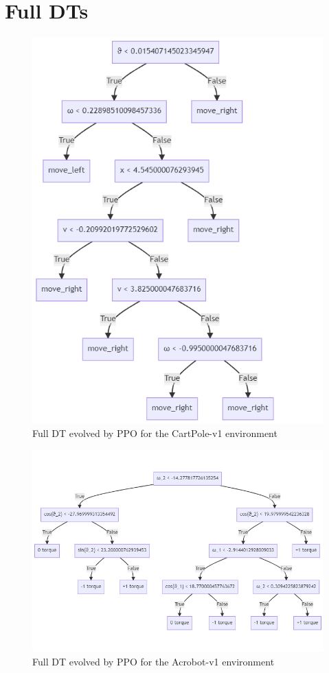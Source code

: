 \section{Full DTs}
\begin{figure}[h!]
    \centering
    \includegraphics[width=0.7\linewidth]{images/CartPole/bestPPOcompleteCP.png}
    \caption{Full DT evolved by PPO for the CartPole-v1 environment}
    \label{fig:TreeFullCP}
\end{figure}

\begin{figure}[h!]
    \centering
    \includegraphics[width=0.7\linewidth]{images/Acrobot/bestPPOcompleteAB.png}
    \caption{Full DT evolved by PPO for the Acrobot-v1 environment}
    \label{fig:TreeFullAB}
\end{figure}

